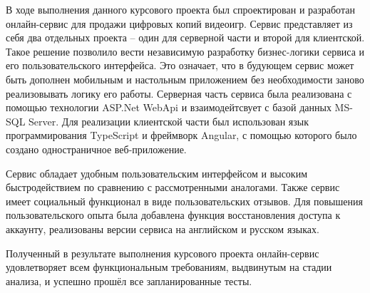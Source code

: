 
В ходе выполнения данного курсового проекта был спроектирован и разработан онлайн-сервис для продажи цифровых копий видеоигр.
Сервис представляет из себя два отдельных проекта -- один для серверной части и второй для клиентской. Такое решение позволило
вести независимую разработку бизнес-логики сервиса и его пользовательского интерфейса. Это означает, что в будующем сервис может
быть дополнен мобильным и настольным приложением без необходимости заново реализовывать логику его работы.
Серверная часть сервиса была реализована с помощью технологии ASP.Net WebApi и взаимодейтсвует с базой данных MS-SQL Server.
Для реализации клиентской части был использован язык программирования TypeScript и фреймворк Angular, с помощью которого было создано
одностраничное веб-приложение.

Сервис обладает удобным пользовательским интерфейсом и высоким быстродействием по сравнению с рассмотренными аналогами. Также сервис
имеет социальный функционал в виде пользовательских отзывов. Для повышения пользовательского опыта была добавлена функция восстановления
доступа к аккаунту, реализованы версии сервиса на английском и русском языках.

Полученный в результате выполнения курсового проекта онлайн-сервис удовлетворяет всем функциональным требованиям, выдвинутым на
стадии анализа, и успешно прошёл все запланированные тесты.